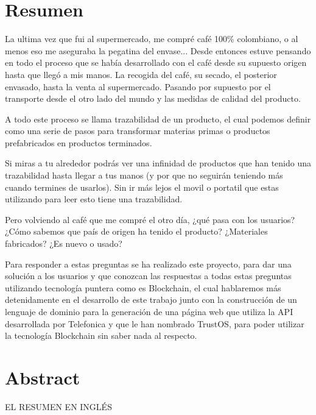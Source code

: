 \chapter*{Resumen}
\thispagestyle{chapterpage}

La ultima vez que fui al supermercado, me compré café 100\% colombiano, o al menos eso me aseguraba la pegatina del envase... Desde entonces estuve pensando en todo el proceso que se había desarrollado con el café desde su supuesto origen hasta que llegó a mis manos. La recogida del café, su secado, el posterior envasado, hasta la venta al supermercado. Pasando por supuesto por el transporte desde el otro lado del mundo y las medidas de calidad del producto.

A todo este proceso se llama trazabilidad de un producto, el cual podemos definir como una serie de pasos para transformar materias primas o productos prefabricados en productos terminados.

Si miras a tu alrededor podrás ver una infinidad de productos que han tenido una trazabilidad hasta llegar a tus manos (y por que no seguirán teniendo más cuando termines de usarlos). Sin ir más lejos el movil o portatil que estas utilizando para leer esto tiene una trazabilidad.

Pero volviendo al café que me compré el otro día, ¿qué pasa con los usuarios? ¿Cómo sabemos que país de origen ha tenido el producto? ¿Materiales fabricados? ¿Es nuevo o usado?

Para responder a estas preguntas se ha realizado este proyecto, para dar una solución a los usuarios y que conozcan las respuestas a todas estas preguntas utilizando tecnología puntera como es Blockchain, el cual hablaremos más detenidamente en el desarrollo de este trabajo junto con la construcción de un lenguaje de dominio para la generación de una página web que utiliza la API desarrollada por Telefonica y que le han nombrado TrustOS, para poder utilizar la tecnología Blockchain sin saber nada al respecto.

\thispagestyle{empty}

\chapter*{Abstract}
\thispagestyle{empty}
EL RESUMEN EN INGLÉS
